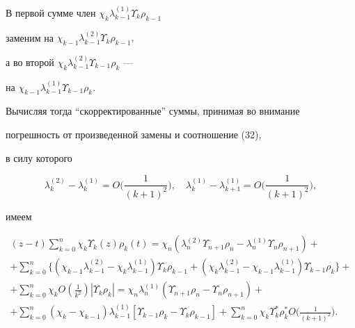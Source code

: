 В первой сумме член $\chi_k \lambda_{k-1}^{(1)}\Upsilon_k \rho_{k-1}$


заменим на $\chi_{k-1} \lambda_{k-1}^{(2)}\Upsilon_k \rho_{k-1}, $


а во второй $\chi_k \lambda_{k-1}^{(2)}\Upsilon_{k-1} \rho_k$ ---


на $\chi_{k-1} \lambda_{k-1}^{(1)}\Upsilon_{k-1} \rho_k$.


Вычисляя тогда ``скорректированные'' суммы, принимая во внимание


погрешность от произведенной замены и соотношение (32),


в силу которого


$$


\lambda_k^{(2)}-\lambda_k^{(1)}=O\bigg(\frac{1}{(k+1)^2}\bigg),


\quad \lambda_k^{(1)}-\lambda_{k+1}^{(1)}=O\bigg(\frac{1}{(k+1)^2}\bigg),


$$


имеем


\begin{multline}


(z-t)\sum_{k=0}^n\chi_k \Upsilon_k(z)\rho_k(t)=


\chi_n (\lambda_n^{(2)}\Upsilon_{n+1} \rho_n


-\lambda_n^{(1)}\Upsilon_n \rho_{n+1})+ \\


%


+\sum_{k=0}^n \{(\chi_{k-1} \lambda_{k-1}^{(2)} -


\chi_k \lambda_{k-1}^{(1)})\Upsilon_k \rho_{k-1}+


(\chi_{k} \lambda_{k-1}^{(2)} -\chi_{k-1}


\lambda_{k-1}^{(1)})\Upsilon_{k-1} \rho_k\}+ \\


%


+\sum_{k=0}^n \chi_k O(\tfrac{1}{k^2})|


\Upsilon_k \rho_k|=\chi_n \lambda_n^{(1)}(\Upsilon_{n+1} \rho_n-


\Upsilon_n \rho_{n+1})+ \\


%


+\sum_{k=0}^n (\chi_k-\chi_{k-1})\lambda_{k-1}^{(1)}[


\Upsilon_{k-1} \rho_k -\Upsilon_k \rho_{k-1}]+


\sum_{k=0}^n \chi_k \Upsilon_k^* \rho_k^* 


O\bigg(\frac{1}{(k+1)^2}\bigg).


\end{multline}


